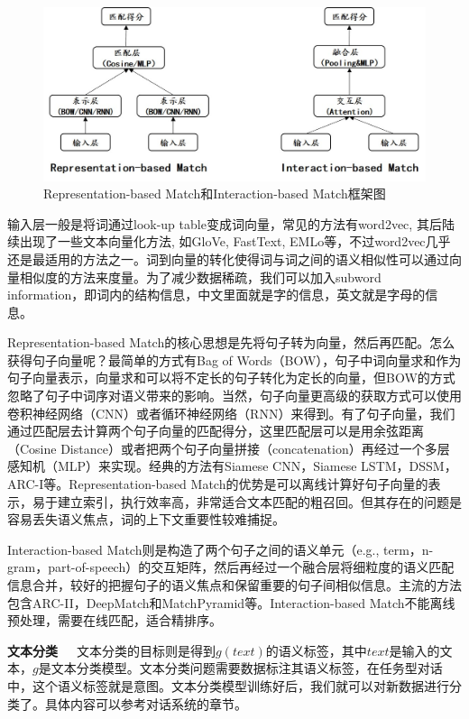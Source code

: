 \begin{figure}[ht]
\centering
\includegraphics[scale=0.6]{./img/chapter4_b/representation-interaction.jpg}
\caption{Representation-based Match和Interaction-based Match框架图}
\label{fig1}
\end{figure}
输入层一般是将词通过look-up table变成词向量，常见的方法有word2vec, 其后陆续出现了一些文本向量化方法, 如GloVe, FastText, EMLo等，不过word2vec几乎还是最适用的方法之一。词到向量的转化使得词与词之间的语义相似性可以通过向量相似度的方法来度量。为了减少数据稀疏，我们可以加入subword information，即词内的结构信息，中文里面就是字的信息，英文就是字母的信息。

Representation-based Match的核心思想是先将句子转为向量，然后再匹配。怎么获得句子向量呢？最简单的方式有Bag of Words（BOW），句子中词向量求和作为句子向量表示，向量求和可以将不定长的句子转化为定长的向量，但BOW的方式忽略了句子中词序对语义带来的影响。当然，句子向量更高级的获取方式可以使用卷积神经网络（CNN）或者循环神经网络（RNN）来得到。有了句子向量，我们通过匹配层去计算两个句子向量的匹配得分，这里匹配层可以是用余弦距离（Cosine Distance）或者把两个句子向量拼接（concatenation）再经过一个多层感知机（MLP）来实现。经典的方法有Siamese CNN，Siamese LSTM，DSSM，ARC-I等。Representation-based Match的优势是可以离线计算好句子向量的表示，易于建立索引，执行效率高，非常适合文本匹配的粗召回。但其存在的问题是容易丢失语义焦点，词的上下文重要性较难捕捉。

Interaction-based Match则是构造了两个句子之间的语义单元（e.g., term，n-gram，part-of-speech）的交互矩阵，然后再经过一个融合层将细粒度的语义匹配信息合并，较好的把握句子的语义焦点和保留重要的句子间相似信息。主流的方法包含ARC-II，DeepMatch和MatchPyramid等。Interaction-based Match不能离线预处理，需要在线匹配，适合精排序。

\textbf{文本分类}~~~文本分类的目标则是得到${g(text)}$的语义标签，其中$text$是输入的文本，$g$是文本分类模型。文本分类问题需要数据标注其语义标签，在任务型对话中，这个语义标签就是意图。文本分类模型训练好后，我们就可以对新数据进行分类了。具体内容可以参考对话系统的章节。

